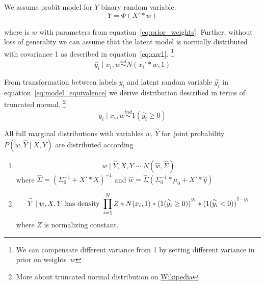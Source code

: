 We assume probit model for $Y$ binary random variable.
\begin{equation}
    Y = \Phi(X' * w) 
\end{equation}

where is $w$ with parameters from equation~\ref{eq:prior_weights}.
Further, without loss of generality we can assume that the latent model is normally distributed with covariance 1 as described in equation~\ref{eq:cov1}.
\footnote{We can compensate different variance from 1 by setting different variance in prior on weights~$w$ }
\begin{equation}\label{eq:cov1}
    \overset{\sim}{y_i} \mid x_i, w \overset{iid}{\sim} N(x_i' * w, 1)
\end{equation}

From transformation between labels $y_i$ and latent random variable $\overset{\sim}{y_i}$ in equation~\ref{eq:model_equivalence} we derive distribution described in terms of truncated normal.
\footnote{More about truncated normal distribution on \href{http://en.wikipedia.org/wiki/Truncated_normal_distribution}{Wikipedia}}
\begin{equation}
    y_i \mid x_i, w \overset{ind}{\sim} 1(\overset{\sim}{y_i} \ge 0)
\end{equation}

\begin{thm}
    All full marginal distributions with variables $w$, $\overset{\sim}{Y}$ for~joint probability $P(w, \overset{\sim}{Y} \mid X, Y)$ are distributed according
\begin{enumerate}
\item
    \begin{equation}\label{eq:margin_w}
    w \mid \overset{\sim}{Y}, X, Y \sim N(\hat{w},\hat{\Sigma})
    \end{equation} 
    where 
    $ \hat{\Sigma} = {(\Sigma_0^{-1} + X' * X)}^{-1} $ 
    and
    $ \hat{w} = \hat{\Sigma} ( \Sigma_0^{-1}*\mu_0 + X' * \overset{\sim}{y} ) $

\item 
    \begin{equation}\label{eq:margin_ytilda}
        \overset{\sim}{Y} \mid w, X, Y \text{ has density } \\
        \prod_{i=1}^{N} Z * N(x_i, 1) * {(1(\overset{\sim}{y_i} \ge 0))}^{y_i} * {(1(\overset{\sim}{y_i} < 0))}^{1-y_i}
    \end{equation} 
    where $Z$ is normalizing constant.
\end{enumerate}
\end{thm}

